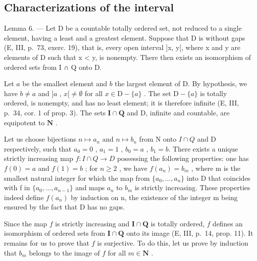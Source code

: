 \subsection{Characterizations of the interval}

Lemma 6. --- Let D be a countable totally ordered set, not reduced to a single element, having a least and a greatest element. Suppose that D is without gaps (E, III, p.~73, exerc. 19), that is, every open interval {]}x, y{[}, where x and y are elements of D such that x \textless{} y, is nonempty. There then exists an isomorphism of ordered sets from I ∩ Q onto D.

Let \(a\) be the smallest element and \(b\) the largest element of D. By hypothesis, we have \(b \neq a\) and \(]a\) , \(x[\neq \emptyset\) for all \(x \in \mathrm{D} - \{a\}\) . The set \(\mathrm{D} - \{a\}\) is totally ordered, is nonempty, and has no least element; it is therefore infinite (E, III, p.~34, cor. 1 of prop. 3). The sets \(\mathbf{I} \cap \mathbf{Q}\) and D, infinite and countable, are equipotent to \(\mathbf{N}\) .

Let us choose bijections \(n \mapsto a_{n}\) and \(n \mapsto b_{n}\) from N onto \(I \cap Q\) and D respectively, such that \(a_{0} = 0\) , \(a_{1} = 1\) , \(b_{0} = a\) , \(b_{1} = b\). There exists a unique strictly increasing map \(f: I \cap Q \to D\) possessing the following properties: one has \(f(0) = a\) and \(f(1) = b\) ; for \(n \geqslant 2\) , we have \(f(a_{n}) = b_{m}\) , where m is the smallest natural integer for which the map from \(\{a_{0}, \ldots, a_{n}\}\) into D that coincides with f in \(\{a_{0}, \ldots, a_{n-1}\}\) and maps \(a_{n}\) to \(b_{m}\) is strictly increasing. These properties indeed define \(f(a_{n})\) by induction on n, the existence of the integer m being ensured by the fact that D has no gaps.

Since the map \(f\) is strictly increasing and \(\mathbf{I} \cap \mathbf{Q}\) is totally ordered, \(f\) defines an isomorphism of ordered sets from \(\mathbf{I} \cap \mathbf{Q}\) onto its image (E, III, p.~14, prop. 11). It remains for us to prove that \(f\) is surjective. To do this, let us prove by induction that \(b_{m}\) belongs to the image of \(f\) for all \(m \in \mathbf{N}\) .

